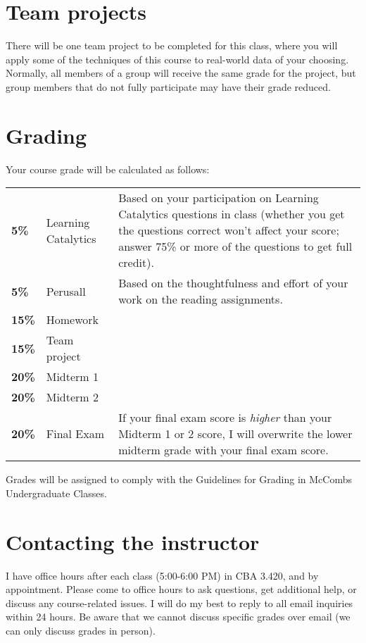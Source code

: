 \documentclass[12pt]{article}
\begin{document}
\section*{Team projects}

There will be one team project to be completed for this class, where you will apply some of the techniques of this course to real-world data of your choosing.  Normally, all members of a group will receive the same grade for the project, but group members that do not fully participate may have their grade reduced.  

\section*{Grading}

Your course grade will be calculated as follows:

\begin{tabular}{llp{4in}}
\textbf{5\%} & Learning Catalytics & Based on your participation on Learning Catalytics questions in class (whether you get the questions correct won't affect your score; answer 75\% or more of the questions to get full credit). \\
\textbf{5\%} & Perusall & Based on the thoughtfulness and effort of your work on the reading assignments. \\
\textbf{15\%} & Homework &  \\
\textbf{15\%} & Team project \\
\textbf{20\%} & Midterm 1 & \\
\textbf{20\%} & Midterm 2 & \\
\textbf{20\%} & Final Exam & If your final exam score is \emph{higher} than your Midterm 1 or 2 score, I will overwrite the lower midterm grade with your final exam score. \\
\end{tabular}
\renewcommand{\arraystretch}{1}

Grades will be assigned to comply with the Guidelines for Grading in McCombs Undergraduate Classes.

\section*{Contacting the instructor}

I have office hours after each class (5:00-6:00 PM) in CBA 3.420, and by appointment.  Please come to office hours to ask questions, get additional help, or discuss any course-related issues.  I will do my best to reply to all email inquiries within 24 hours. Be aware that we cannot discuss specific grades over email (we can only discuss grades in person).
\end{document}
